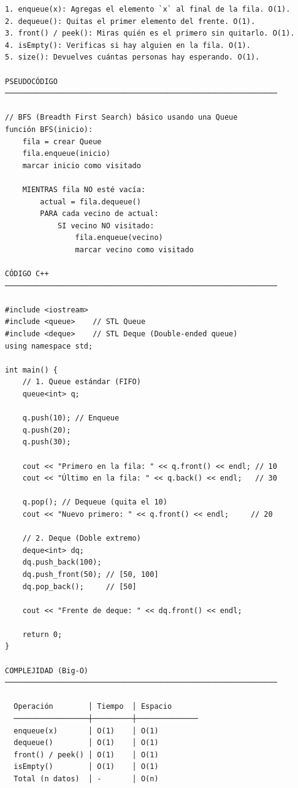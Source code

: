 \begin{lstlisting}
1. enqueue(x): Agregas el elemento `x` al final de la fila. O(1).
2. dequeue(): Quitas el primer elemento del frente. O(1).
3. front() / peek(): Miras quién es el primero sin quitarlo. O(1).
4. isEmpty(): Verificas si hay alguien en la fila. O(1).
5. size(): Devuelves cuántas personas hay esperando. O(1).

PSEUDOCÓDIGO
──────────────────────────────────────────────────────────────

// BFS (Breadth First Search) básico usando una Queue
función BFS(inicio):
    fila = crear Queue
    fila.enqueue(inicio)
    marcar inicio como visitado

    MIENTRAS fila NO esté vacía:
        actual = fila.dequeue()
        PARA cada vecino de actual:
            SI vecino NO visitado:
                fila.enqueue(vecino)
                marcar vecino como visitado

CÓDIGO C++
──────────────────────────────────────────────────────────────

#include <iostream>
#include <queue>    // STL Queue
#include <deque>    // STL Deque (Double-ended queue)
using namespace std;

int main() {
    // 1. Queue estándar (FIFO)
    queue<int> q;
    
    q.push(10); // Enqueue
    q.push(20);
    q.push(30);

    cout << "Primero en la fila: " << q.front() << endl; // 10
    cout << "Último en la fila: " << q.back() << endl;   // 30

    q.pop(); // Dequeue (quita el 10)
    cout << "Nuevo primero: " << q.front() << endl;     // 20

    // 2. Deque (Doble extremo)
    deque<int> dq;
    dq.push_back(100);
    dq.push_front(50); // [50, 100]
    dq.pop_back();     // [50]
    
    cout << "Frente de deque: " << dq.front() << endl;

    return 0;
}

COMPLEJIDAD (Big-O)
──────────────────────────────────────────────────────────────

  Operación        │ Tiempo  │ Espacio
  ─────────────────┼─────────┼──────────────
  enqueue(x)       │ O(1)    │ O(1)
  dequeue()        │ O(1)    │ O(1)
  front() / peek() │ O(1)    │ O(1)
  isEmpty()        │ O(1)    │ O(1)
  Total (n datos)  │ -       │ O(n)
\end{lstlisting}

